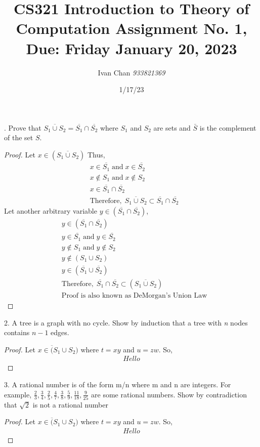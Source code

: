 \documentclass[12pt, letterpaper]{article}
\title{CS321 Introduction to Theory of Computation
Assignment No. 1, Due: Friday January 20, 2023}
\author{Ivan Chan \textit{933821369}}
\date{1/17/23}
\begin{document}
. Prove that $\overline{S_1 \cup S_2} = \overline{S_1} \cap \overline{S_2}$ where $S_1$ and $S_2$ are sets and $\bar{S}$ is the
    complement of the set $S$.
    \begin{proof}
        Let $x \in (\overline{S_1 \cup S_2})$ Thus,
        \begin{align*}
        & x \in \overline{S_1} \;\text{and}\; x \in \overline{S_2}\\
        & x \notin S_1 \;\mbox{and}\; x \notin S_2\\
        & x \in \overline{S_1} \cap \overline{S_2}\\
        & \mbox{Therefore},\; \overline{S_1 \cup S_2} \subset \overline{S_1} \cap \overline{S_2}
        \end{align*}
        Let another arbitrary variable $y \in (\overline{S_1} \cap \overline{S_2})$,
        \begin{align*}
        & y \in (\overline{S_1} \cap \overline{S_2})\\
        &    y \in \overline{S_1} \;\mbox{and}\; y \in \overline{S_2}\\
        &   y \notin S_1 \;\mbox{and}\; y \notin S_2\\
        &   y \notin (S_1 \cup S_2)\\
        &   y \in (\overline{S_1} \cup \overline{S_2})\\
        &   \mbox{Therefore}, \; \overline{S_1} \cap \overline{S_2} \subset (\overline{S_1 \cup S_2})\\
        &   \mbox{Proof is also known as DeMorgan's Union Law}
        \end{align*}
    \end{proof}


    2. A tree is a graph with no cycle. Show by induction that a tree with \textit{n}
    nodes contains $n - 1$ edges.
    \begin{proof}
        Let $x \in \overline({S_1 \cup S_2})$ where $t=xy$ and $u=zw$. So,
        \begin{align*}
            Hello
        \end{align*}
    \end{proof}

    3. A rational number is of the form m/n where m and n are integers.
    For example, $\frac{2}{3},\frac{3}{4},\frac{2}{5},\frac{4}{7},\frac{3}{8},\frac{5}{9},\frac{11}{18},\frac{9}{25}$ are some rational
    numbers. Show by contradiction that $\sqrt{2}$ is not a rational number
    \begin{proof}
        Let $x \in \overline({S_1 \cup S_2})$ where $t=xy$ and $u=zw$. So,
        \begin{align*}
            Hello
        \end{align*}
    \end{proof}
\end{document}
